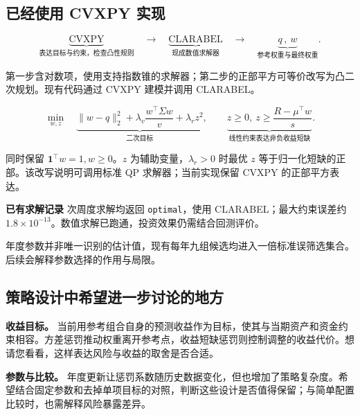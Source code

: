 \documentclass[UTF8,zihao=-4]{ctexart}
\newcommand{\note}[1]{{\small\color{softgray}#1\par}}
\newcommand{\askbox}[1]{\par\smallskip\colorbox{paleblue}{\parbox{\dimexpr\linewidth-2\fboxsep\relax}{\small #1}}\par}
\begin{document}
\subsection*{已经使用 CVXPY 实现}
\[
 \underbrace{\text{CVXPY}}_{\text{表达目标与约束，检查凸性规则}}
 \quad\longrightarrow\quad
 \underbrace{\text{CLARABEL}}_{\text{现成数值求解器}}
 \quad\longrightarrow\quad
 \underbrace{q\,,\ w}_{\text{参考权重与最终权重}}.
\]
\note{第一步含对数项，使用支持指数锥的求解器；第二步的正部平方可等价改写为凸二次规划。现有代码通过 CVXPY 建模并调用 CLARABEL。}
\[
 \min_{w,z}\quad
 \underbrace{\|w-q\|_2^2+\lambda_v\frac{w^\top\Sigma w}{v}+\lambda_r z^2}_{\text{二次目标}},
 \qquad
 \underbrace{z\ge0,\ z\ge\frac{R-\mu^\top w}{s}}_{\text{线性约束表达非负收益短缺}}.
\]
\note{同时保留 $\mathbf1^\top w=1,w\ge0$。$z$ 为辅助变量，$\lambda_r>0$ 时最优 $z$ 等于归一化短缺的正部。该改写说明可调用标准 QP 求解器；当前实现保留 CVXPY 的正部平方表达。}

\askbox{\textbf{已有求解记录} 次周度求解均返回 \texttt{optimal}，使用 CLARABEL；最大约束误差约 $1.8\times10^{-13}$。数值求解已跑通，投资效果仍需结合回测评价。}
\note{年度参数并非唯一识别的估计值，现有每年九组候选均进入一倍标准误筛选集合。后续会解释参数选择的作用与局限。}

\subsection*{策略设计中希望进一步讨论的地方}
\textbf{收益目标。} 当前用参考组合自身的预测收益作为目标，使其与当期资产和资金约束相容。方差惩罚推动权重离开参考点，收益短缺惩罚则控制调整的收益代价。想请您看看，这样表达风险与收益的取舍是否合适。

\textbf{参数与比较。} 年度更新让惩罚系数随历史数据变化，但也增加了策略复杂度。希望结合固定参数和去掉单项目标的对照，判断这些设计是否值得保留；与简单配置比较时，也需解释风险暴露差异。

\clearpage
\end{document}
